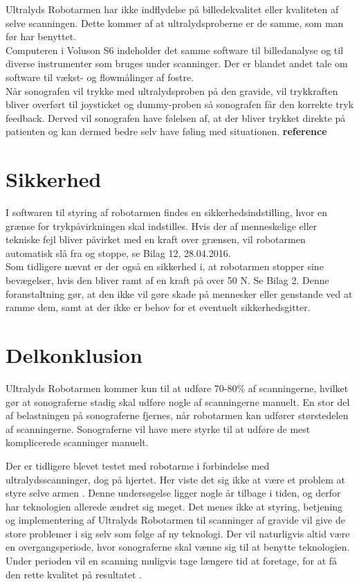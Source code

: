 Ultralyds Robotarmen har ikke indflydelse på billedekvalitet eller kvaliteten af selve scanningen. Dette kommer af at ultralydsproberne er de samme, som man før har benyttet. \\
Computeren i Voluson S6 indeholder det samme software til billedanalyse og til diverse instrumenter som bruges under scanninger. Der er blandet andet tale om software til vækst- og flowmålinger af fostre.   \\
Når sonografen vil trykke med ultralydsproben på den gravide, vil trykkraften bliver overført til joysticket og dummy-proben så sonografen får den korrekte tryk feedback. Derved vil sonografen have følelsen af, at der bliver trykket direkte på patienten og kan dermed bedre selv have føling med situationen. \textbf{reference} 

\section{Sikkerhed}
I softwaren til styring af robotarmen findes en sikkerhedsindstilling, hvor en grænse for trykpåvirkningen skal indstilles. Hvis der af menneskelige eller tekniske fejl bliver påvirket med en kraft over grænsen, vil robotarmen automatisk slå fra og stoppe, se Bilag 12, 28.04.2016. \\
Som tidligere nævnt er der også en sikkerhed i, at robotarmen stopper sine bevægelser, hvis den bliver ramt af en kraft på over 50 N. Se Bilag 2. Denne foranstaltning gør, at den ikke vil gøre skade på mennesker eller genstande ved at ramme dem, samt at der ikke er behov for et eventuelt sikkerhedsgitter. 

\section{Delkonklusion}
Ultralyds Robotarmen kommer kun til at udføre 70-80\% af scanningerne, hvilket gør at sonograferne stadig skal udføre nogle af scanningerne manuelt. En stor del af belastningen på sonograferne fjernes, når robotarmen kan udfører størstedelen af scanningerne. Sonograferne vil have mere styrke til at udføre de mest komplicerede scanninger manuelt.

Der er tidligere blevet testet med robotarme i forbindelse med ultralydsscanninger, dog på hjertet. Her viste det sig ikke at være et problem at styre selve armen \cite{Hjerterobot}. Denne undersøgelse ligger nogle år tilbage i tiden, og derfor har teknologien allerede ændret sig meget. Det menes ikke at styring, betjening og implementering af Ultralyds Robotarmen til scanninger af gravide vil give de store problemer i sig selv som følge af ny teknologi. Der vil naturligvis altid være en overgangsperiode, hvor sonograferne skal vænne sig til at benytte teknologien. Under perioden vil en scanning muligvis tage længere tid at foretage, for at få den rette kvalitet på resultatet \cite{8}. 